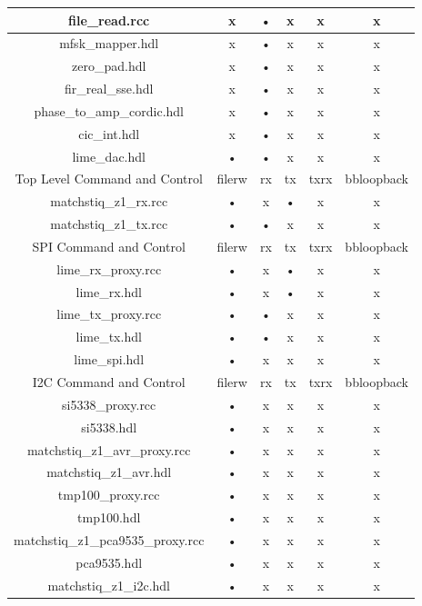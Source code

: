\begin{tabular}{|c|c|c|c|c|c|}
	\hline
	file\_read.rcc & x & • & x & x & x \\
	\hline
	mfsk\_mapper.hdl & x & • & x & x & x \\
	\hline
	zero\_pad.hdl & x & • & x & x & x \\
	\hline
	fir\_real\_sse.hdl & x & • & x & x & x \\
	\hline
	phase\_to\_amp\_cordic.hdl & x & • & x & x & x \\
	\hline
	cic\_int.hdl & x & • & x & x & x \\
	\hline
	lime\_dac.hdl & • & • & x & x & x \\
	\hline
	\rowcolor{blue}
	Top Level Command and Control & filerw & rx & tx & txrx & bbloopback \\
	\hline
	matchstiq\_z1\_rx.rcc & • & x & • & x & x \\
	\hline
	matchstiq\_z1\_tx.rcc & • & • & x & x & x \\
	\hline
	\rowcolor{blue}
	SPI Command and Control & filerw & rx & tx & txrx & bbloopback \\
	\hline
	lime\_rx\_proxy.rcc & • & x & • & x & x \\
	\hline
	lime\_rx.hdl & • & x & • & x & x \\
	\hline
	lime\_tx\_proxy.rcc & • & • & x & x & x \\
	\hline
	lime\_tx.hdl & • & • & x & x & x \\
	\hline
	lime\_spi.hdl & • & x & x & x & x \\
	\hline
	\rowcolor{blue}
	I2C Command and Control & filerw & rx & tx & txrx & bbloopback \\
	\hline
	si5338\_proxy.rcc & • & x & x & x & x \\
	\hline
	si5338.hdl & • & x & x & x & x \\
	\hline
	matchstiq\_z1\_avr\_proxy.rcc & • & x & x & x & x \\
	\hline
	matchstiq\_z1\_avr.hdl & • & x & x & x & x \\
	\hline
	tmp100\_proxy.rcc & • & x & x & x & x \\
	\hline
	tmp100.hdl & • & x & x & x & x \\
	\hline
	matchstiq\_z1\_pca9535\_proxy.rcc & • & x & x & x & x \\
	\hline
	pca9535.hdl & • & x & x & x & x \\
	\hline
	matchstiq\_z1\_i2c.hdl & • & x & x & x & x \\
	\hline
	\end{tabular}

